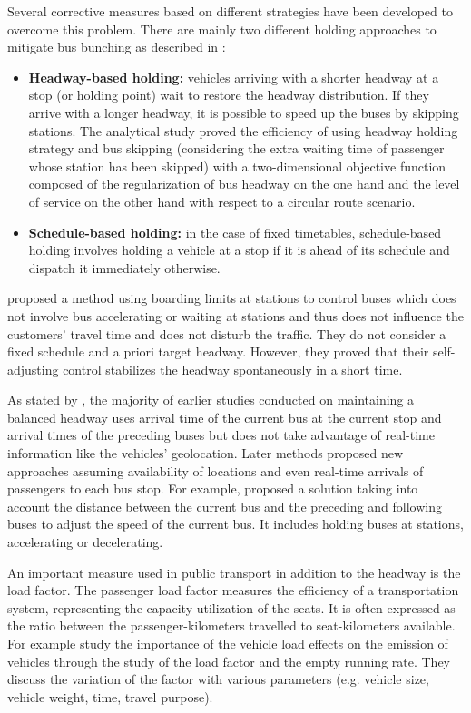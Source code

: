 \documentclass[12pt,a4paper]{article}
\begin{document}
Several corrective measures based on different strategies have been developed to overcome this problem. There are mainly two different holding approaches to mitigate bus bunching as described in \cite{reliability}:

\begin{itemize}
\item \textbf{Headway-based holding:} vehicles arriving with a shorter headway at a stop (or holding point) wait to restore the headway distribution. If they arrive with a longer headway, it is possible to speed up the buses by skipping stations. The analytical study \cite{hybrid} proved the efficiency of using headway holding strategy and bus skipping (considering the extra waiting time of passenger whose station has been skipped) with a two-dimensional objective function composed of the regularization of bus headway on the one hand and the level of service on the other hand with respect to a circular route scenario. 
\item \textbf{Schedule-based holding:} in the case of fixed timetables, schedule-based holding involves holding a vehicle at a stop if it is ahead of its schedule and dispatch it immediately otherwise.
\end{itemize}
  
\cite{selfadjusting} proposed a method using boarding limits at stations to control buses which does not involve bus accelerating or waiting at stations and thus does not influence the customers' travel time and does not disturb the traffic. They do not consider a fixed schedule and a priori target headway. However, they proved that their self-adjusting control stabilizes the headway spontaneously in a short time. 

As stated by \cite{information}, the majority of earlier studies conducted on maintaining a balanced headway uses arrival time of the current bus at the current stop and arrival times of the preceding buses but does not take advantage of real-time information like the vehicles' geolocation. Later methods proposed new approaches assuming availability of locations and even real-time arrivals of passengers to each bus stop. For example, \cite{cooperation} proposed a solution taking into account the distance between the current bus and the preceding and following buses to adjust the speed of the current bus. It includes holding buses at stations, accelerating or decelerating. 

An important measure used in public transport in addition to the headway is the load factor. The passenger load factor measures the efficiency of a transportation system, representing the capacity utilization of the seats. It is often expressed as the ratio between the passenger-kilometers travelled to seat-kilometers available. For example \cite{loadfactor} study the importance of the vehicle load effects on the emission of vehicles through the study of the load factor and the empty running rate. They discuss the variation of the factor with various parameters (e.g. vehicle size, vehicle weight, time, travel purpose).
\end{document}
